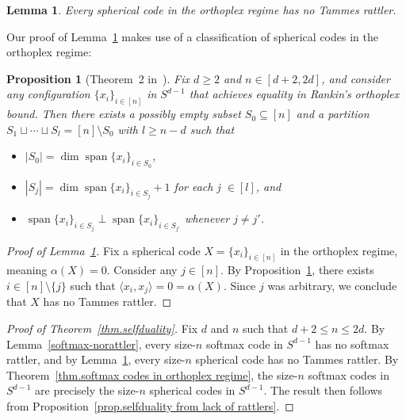 \documentclass{article}
\theoremstyle{plain}
\newtheorem{lemma}[theorem]{Lemma}
\newtheorem{proposition}[theorem]{Proposition}
\theoremstyle{definition}
\begin{document}
\begin{lemma}
\label{lem.no Tammes rattlers}
Every spherical code in the orthoplex regime has no Tammes rattler.
\end{lemma}

Our proof of Lemma~\ref{lem.no Tammes rattlers} makes use of a classification of spherical codes in the orthoplex regime:

\begin{proposition}[Theorem~2 in~\cite{CoxKMP:20}]
\label{prop.orthoplex structure theorem}
Fix $d\geq 2$ and $n\in[d+2,2d]$, and consider any configuration $\{x_i\}_{i\in[n]}$ in $S^{d-1}$ that achieves equality in Rankin's orthoplex bound.
Then there exists a possibly empty subset $S_0\subseteq[n]$ and a partition $S_1\sqcup\cdots\sqcup S_l=[n]\setminus S_0$ with $l\geq n-d$ such that
\begin{itemize}
\item[(a)]
$|S_0| = \operatorname{dim}\operatorname{span}\{x_i\}_{i\in S_0}$,
\item[(b)]
$|S_j| = \operatorname{dim}\operatorname{span}\{x_i\}_{i\in S_j}+1$ for each j $\in [l]$, and
\item[(c)]
$\operatorname{span}\{x_i\}_{i\in S_j} \perp \operatorname{span}\{x_i\}_{i\in S_{j'}}$ whenever $j\neq j'$.
\end{itemize}
\end{proposition}

\begin{proof}[Proof of Lemma~\ref{lem.no Tammes rattlers}]
Fix a spherical code $X=\{x_i\}_{i\in[n]}$ in the orthoplex regime, meaning $\alpha(X)=0$.
Consider any $j\in[n]$.
By Proposition~\ref{prop.orthoplex structure theorem}, there exists $i\in[n]\setminus\{j\}$ such that $\langle x_i,x_j\rangle=0=\alpha(X)$.
Since $j$ was arbitrary, we conclude that $X$ has no Tammes rattler.
\end{proof}

\begin{proof}[Proof of Theorem~\ref{thm.selfduality}]
Fix $d$ and $n$ such that $d+2\leq n\leq 2d$.
By Lemma~\ref{softmax-norattler}, every size-$n$ softmax code in $S^{d-1}$ has no softmax rattler, and by Lemma~\ref{lem.no Tammes rattlers}, every size-$n$ spherical code has no Tammes rattler.
By Theorem~\ref{thm.softmax codes in orthoplex regime}, the size-$n$ softmax codes in $S^{d-1}$ are precisely the size-$n$ spherical codes in $S^{d-1}$.
The result then follows from Proposition~\ref{prop.selfduality from lack of rattlers}.
\end{proof}
\end{document}
